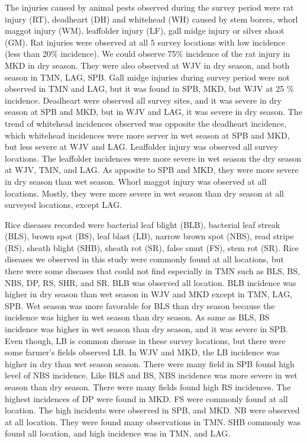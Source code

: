 The injuries caused by animal pests observed during the survey period were rat injury (RT), deadheart (DH) and whitehead (WH) caused by stem borers, whorl maggot injury (WM), leaffolder injury (LF), gall midge injury or silver shoot (GM). Rat injuries were observed at all 5 survey locations with low incidence (less than 20\% incidence). We could observe 75\% incidence of the rat injury in MKD in dry season. They were also observed at WJV in dry season, and both season in TMN, LAG, SPB. Gall midge injuries during survey period were not observed in TMN and LAG, but it was found in SPB, MKD, but WJV at 25 \% incidence. Deadheart were observed all survey sites, and it was severe in dry season at SPB and MKD, but in WJV and LAG, it was severe in dry season. The trend of whitehead incidences observed was opposite the deadheart incidence, which whitehead incidences were more server in wet season at SPB and MKD, but less severe at WJV and LAG. Leaffolder injury was observed all survey locations. The leaffolder incidences were more severe in wet season the dry season at WJV, TMN, and LAG. As apposite to SPB and MKD, they were more severe in dry season than wet season. Whorl maggot injury was observed at all locations. Mostly, they were more severe in wet season than dry season at all surveyed locations, except LAG.

Rice diseases recorded were bacterial leaf blight (BLB), bacterial leaf streak (BLS), brown spot (BS), leaf blast (LB), narrow brown spot (NBS), read stripe (RS), sheath blight (SHB), sheath rot (SR), false smut (FS), stem rot (SR). Rice diseases we observed in this study were commonly found at all locations, but there were some diseases that could not find especially in TMN such as BLS, BS, NBS, DP, RS, SHR, and SR. BLB was observed all location. BLB incidence was higher in dry season than wet season in WJV and MKD except in TMN, LAG, SPB. Wet season was more favorable for BLS than dry season because the incidence was higher in wet season than dry season. As same as BLS, BS incidence was higher in wet season than dry season, and it was severe in SPB. Even though, LB is common disease in these survey locations, but there were some farmer’s fields observed LB. In WJV and MKD, the LB incidence was higher in dry than wet season season. There were many field in SPB found high level of NBS incidence. Like BLS and BS, NBS incidence was more severe in wet season than dry season. There were many fields found high RS incidences. The highest incidences of DP were found in MKD. FS were commonly found at all location. The high incidents were observed in SPB, and MKD. NB were observed at all location. They were found many observations in TMN.  SHB commonly was found all location, and high incidence was in TMN, and LAG. 


